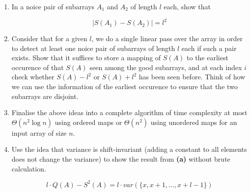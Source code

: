\begin{enumerate}
\begin{enumerate}[label=\textbf{(\alph*)}]
\item In a noice pair of subarrays $A_1$ and $A_2$ of length $l$ each, show that 

\[
|S(A_1)-S(A_2)|=l^2
\]

\item Consider that for a given $l$, we do a single linear pass over the array in order to detect at 
least one noice pair of subarrays of length $l$ each if such a pair exists. Show that it suffices to store 
a mapping of $S(A)$ to the earliest occurence of that $S(A)$ seen among the good subarrays, and at each 
index $i$ check whether $S(A)-l^2$ or $S(A)+l^2$ has been seen before. Think of how we can use the information of 
the earliest occurence to ensure that the two subarrays are disjoint. 

\item Finalise the above ideas into a complete algorithm of time complexity at most $\Theta(n^2\log n)$ using 
ordered maps or $\Theta(n^2)$ using unordered maps for an input array of size $n$.

\item Use the idea that variance is shift-invariant (adding a constant to all 
elements does not change the variance) to show the result from \textbf{(a)} without brute calculation.

\[
l\cdot Q(A)-S^2(A) = l \cdot var(\{x,x+1,\dots,x+l-1\}) 
\]


\end{enumerate}

\end{enumerate}